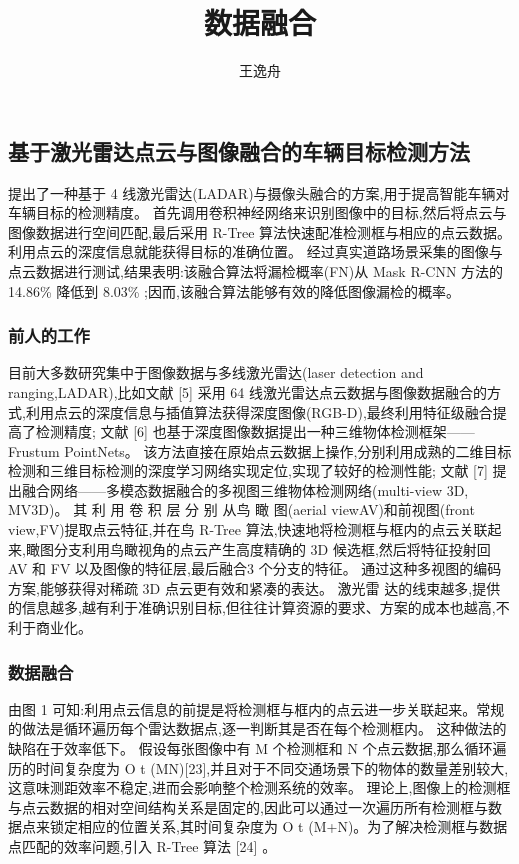 \message{ !name(\unexpanded{数据融合}.tex)}\documentclass{amsart}
\title{数据融合}
\author{王逸舟}
\begin{document}


\maketitle
\tableofcontents
\subsection{基于激光雷达点云与图像融合的车辆目标检测方法}
\cite{胡远志}提出了一种基于 4 线激光雷达(LADAR)与摄像头融合的方案,用于提高智能车辆对车辆目标的检测精度。
首先调用卷积神经网络来识别图像中的目标,然后将点云与图像数据进行空间匹配,最后采用 R-Tree 算法快速配准检测框与相应的点云数据。
利用点云的深度信息就能获得目标的准确位置。
经过真实道路场景采集的图像与点云数据进行测试,结果表明:该融合算法将漏检概率(FN)从 Mask R-CNN 方法的 14.86\% 降低到 8.03\% ;因而,该融合算法能够有效的降低图像漏检的概率。

\subsubsection{前人的工作}
目前大多数研究集中于图像数据与多线激光雷达(laser detection and ranging,LADAR),比如文献 [5] 采用 64 线激光雷达点云数据与图像数据融合的方式,利用点云的深度信息与插值算法获得深度图像(RGB-D),最终利用特征级融合提高了检测精度;
文献 [6] 也基于深度图像数据提出一种三维物体检测框架——Frustum PointNets。
该方法直接在原始点云数据上操作,分别利用成熟的二维目标检测和三维目标检测的深度学习网络实现定位,实现了较好的检测性能;
文献 [7] 提出融合网络——多模态数据融合的多视图三维物体检测网络(multi-view 3D, MV3D)。 其 利 用 卷 积 层 分 别 从鸟 瞰 图(aerial viewAV)和前视图(front view,FV)提取点云特征,并在鸟 R-Tree 算法,快速地将检测框与框内的点云关联起来,瞰图分支利用鸟瞰视角的点云产生高度精确的 3D 候选框,然后将特征投射回 AV 和 FV 以及图像的特征层,最后融合3 个分支的特征。
通过这种多视图的编码方案,能够获得对稀疏 3D 点云更有效和紧凑的表达。
激光雷 达的线束越多,提供的信息越多,越有利于准确识别目标,但往往计算资源的要求、方案的成本也越高,不利于商业化。
\subsubsection{数据融合}
由图 1 可知:利用点云信息的前提是将检测框与框内的点云进一步关联起来。常规的做法是循环遍历每个雷达数据点,逐一判断其是否在每个检测框内。
这种做法的缺陷在于效率低下。
假设每张图像中有 M 个检测框和 N 个点云数据,那么循环遍历的时间复杂度为 O t (MN)[23],并且对于不同交通场景下的物体的数量差别较大,这意味测距效率不稳定,进而会影响整个检测系统的效率。
理论上,图像上的检测框与点云数据的相对空间结构关系是固定的,因此可以通过一次遍历所有检测框与数据点来锁定相应的位置关系,其时间复杂度为 O t (M+N)。为了解决检测框与数据点匹配的效率问题,引入 R-Tree 算法 [24] 。
\end{document}
